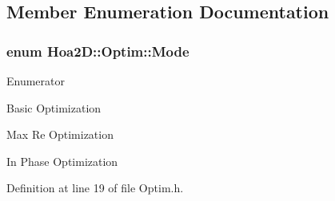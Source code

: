 \subsection{Member Enumeration Documentation}
\hypertarget{class_hoa2_d_1_1_optim_ae40f22368cb55699cf19729e37c0aff3}{
\subsubsection[{Mode}]{\setlength{\rightskip}{0pt plus 5cm}enum {\bf Hoa2\-D\-::\-Optim\-::\-Mode}}}\label{class_hoa2_d_1_1_optim_ae40f22368cb55699cf19729e37c0aff3}
\begin{Desc}
\item[Enumerator]\par
\begin{description}
\item[{\em 
\hypertarget{class_hoa2_d_1_1_optim_ae40f22368cb55699cf19729e37c0aff3af5bbb98a42968855f2f43d9a708ae8d2}{Basic}\label{class_hoa2_d_1_1_optim_ae40f22368cb55699cf19729e37c0aff3af5bbb98a42968855f2f43d9a708ae8d2}
}]Basic Optimization \item[{\em 
\hypertarget{class_hoa2_d_1_1_optim_ae40f22368cb55699cf19729e37c0aff3a6b8b2446e2cffae18f5f4625b68e0f21}{Max\-Re}\label{class_hoa2_d_1_1_optim_ae40f22368cb55699cf19729e37c0aff3a6b8b2446e2cffae18f5f4625b68e0f21}
}]Max Re Optimization \item[{\em 
\hypertarget{class_hoa2_d_1_1_optim_ae40f22368cb55699cf19729e37c0aff3aa9a64070fdf166180add5ac7a8e24567}{In\-Phase}\label{class_hoa2_d_1_1_optim_ae40f22368cb55699cf19729e37c0aff3aa9a64070fdf166180add5ac7a8e24567}
}]In Phase Optimization \end{description}
\end{Desc}


Definition at line 19 of file Optim.\-h.



